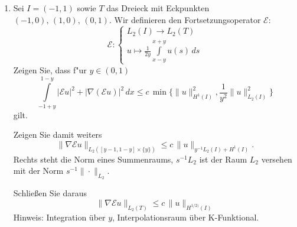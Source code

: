 \documentclass[11pt,a4paper]{report}
\begin{document}
\begin{enumerate}
 \item Sei $I=(-1, 1)$ sowie $T$ das Dreieck mit Eckpunkten $(-1,0),\,(1,0),\,(0,1)$. Wir definieren den Fortsetzungsoperator $\mathcal{E}$:
$$\mathcal{E}: \left\{
							\begin{matrix}   L_2(I) \rightarrow L_2(T) \\ 
					 									u \mapsto \frac{1}{2y}\int\limits_{x-y}^{x+y}u(s) \,ds
					    \end{matrix}\right.$$
Zeigen Sie, dass f"ur $y\in (0,1)$ 
$$\int\limits_{-1+y}^{1-y} |\mathcal{E}u|^2 + |\nabla(\mathcal{E}u)|^2\,dx \leq c\, \min\{\|u\|^2_{H^1(I)}, \frac{1}{y^2}\|u\|^2_{L_2(I)}\}$$
gilt.

Zeigen Sie damit weiters
$$
\| \nabla \mathcal{E}u \|_{L_2([y-1,1-y] \times \{y\}) } \leq c \, \|u \|_{y^{-1}L_2(I) + H^1(I)}. 
$$
Rechts steht die Norm eines Summenraums, $s^{-1}L_2$ ist der Raum $L_2$
versehen mit der \newline Norm $s^{-1}\| \cdot \|_{L_2}$.

Schlie\ss{}en Sie daraus
$$
\| \nabla \mathcal{E}u \|_{L_2(T) } \leq c \, \|u\|_{H^{1/2)}(I)}
  $$
Hinweis: Integration \"uber $y$, Interpolationsraum \"uber K-Funktional.

  
\end{enumerate}
\end{document}
